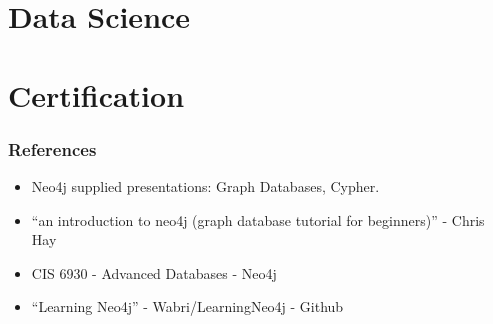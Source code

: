 % 


% 

% 

% 

% 

\section[DS]{Data Science}



\section[Cert]{Certification}


\begin{frame}\frametitle{References}
\begin{itemize}
\item Neo4j supplied presentations: Graph Databases, Cypher.
\item ``an introduction to neo4j (graph database tutorial for beginners)'' - Chris Hay
\item CIS 6930 - Advanced Databases - Neo4j 
\item ``Learning Neo4j'' - Wabri/LearningNeo4j - Github
\end{itemize}
\end{frame}